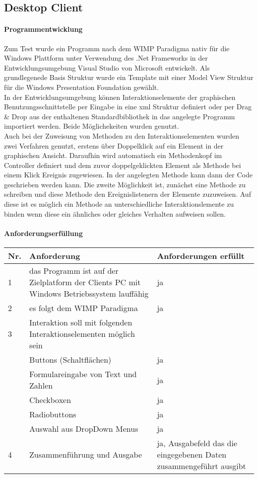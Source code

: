 \documentclass[11pt,oneside,a4paper,notitlepage]{article}
\begin{document}
\subsection{Desktop Client}
%
\paragraph*{Programmentwicklung}
Zum Test wurde ein Programm nach dem WIMP Paradigma nativ für die Windows Plattform unter Verwendung des .Net Frameworks in der Entwicklungsumgebung Visual Studio 
von Microsoft entwickelt. 
Als grundlegenede Basis Struktur wurde ein Template mit einer Model View Struktur für die Windows Presentation Foundation gewählt.\\
In der Entwicklungsumgebung können Interaktionselemente der graphischen Benutzungsschnittstelle per Eingabe in eine xml Struktur definiert oder per Drag \& Drop aus der enthaltenen Standardbibliothek in das angelegte Programm importiert werden. Beide Möglichekeiten wurden genutzt.\\
Auch bei der Zuweisung von Methoden zu den Interaktionselementen wurden zwei Verfahren genutzt, erstens über Doppelklick auf ein Element in der graphischen Ansicht. Daraufhin 
wird automatisch ein Methodenkopf im Controller definiert und dem zuvor doppelgeklickten Element als Methode bei einem Klick Ereignis zugewiesen. In der angelegten Methode kann dann der Code geschrieben werden kann. Die zweite Möglichkeit ist, zunächst eine Methode zu schreiben und diese Methode den Ereignislistenern der Elemente zuzuweisen. Auf diese ist es möglich ein Methode 
an unterschiedliche Interaktionslemente zu binden wenn diese ein ähnliches oder gleiches Verhalten aufweisen sollen.

%
\paragraph*{Anforderungserfüllung}
\begin{center}
\begin{tabular}{| p{20mm} | p{80mm} | p{60mm} |}
\hline
Nr. & Anforderung & Anforderungen erfüllt\\
\hline
1 & das Programm ist auf der Zielplatform der Clients PC mit Windows Betriebssystem lauffähig  & ja\\
\hline
2 & es folgt dem WIMP Paradigma & ja\\
\hline
3 & Interaktion soll mit folgenden Interaktionselementen möglich sein &  \\
 &  Buttons (Schaltflächen) & ja \\
 &  Formulareingabe von Text und Zahlen & ja  \\
 &  Checkboxen & ja \\
 &  Radiobuttons & ja \\
 &  Auswahl aus DropDown Menus & ja \\
\hline
4 & Zusammenführung und Ausgabe  & ja, Ausgabefeld das die eingegebenen Daten zusammengeführt ausgibt \\
\hline
\end{tabular}
\end{center}
%
\end{document}
